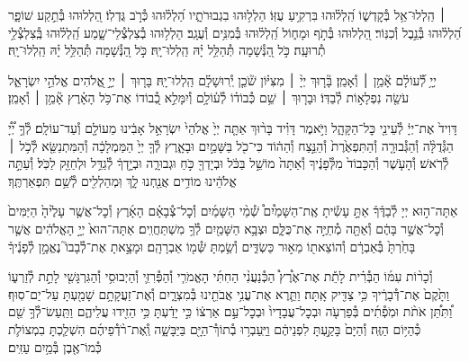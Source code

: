 \documentclass[twoside, openany, parskip=half, 11pt]{book}
\begin{document}
 ׀ \hfill \break
הַֽלְלוּ־אֵ֥ל בְּ֯קׇדְשׁ֑וֹ הַֽ֝לְל֗וּהוּ בִּרְקִ֥יעַ עֻזּֽוֹ׃
הַלְל֥וּהוּ בִגְבוּרֹתָ֑יו הַ֝לְל֗וּהוּ כְּ֯רֹ֣ב גֻּדְלֽוֹ׃
הַ֭לְלוּהוּ בְּ֯תֵ֣קַע שׁוֹפָ֑ר הַ֝לְל֗וּהוּ בְּ֯נֵ֣בֶל וְ֯כִנּֽוֹר׃
הַ֭לְלוּהוּ בְּ֯תֹ֣ף וּמָח֑וֹל הַֽ֝לְל֗וּהוּ בְּ֯מִנִּ֥ים וְ֯עֻגָֽב׃
הַלְל֥וּהוּ בְ֯צִלְצְ֯לֵי־שָׁ֑מַע הַֽ֝לְל֗וּהוּ בְּֽ֯צִלְצְ֯לֵ֥י תְ֯רוּעָֽה׃
כֹּ֣ל הַ֭נְּ֯שָׁמָה תְּ֯הַלֵּ֥ל יָ֗הּ הַֽלְלוּ־יָֽהּ׃
\scriptsize{כֹּ֣ל הַ֭נְּ֯שָׁמָה תְּ֯הַלֵּ֥ל יָ֗הּ הַֽלְלוּ־יָֽהּ׃ \\}
\normalsize{}

\negline

יְיָ֥ לְ֯֝עוֹלָ֗ם אָ֘מֵ֥ן ׀ וְ֯אָמֵֽן׃ \hfill \break
{}בָּ֘ר֤וּךְ יְיָ֨ ׀ מִצִּיּ֗וֹן שֹׁ֘כֵ֤ן יְֽ֯רוּשָׁלָ֗‍ִם הַֽלְלוּ־יָֽהּ׃ \hfill \break
{}בָּר֤וּךְ ׀ יְיָ֣ אֱ֭לֹהִים אֱלֹהֵ֣י יִשְׂרָאֵ֑ל עֹשֵׂ֖ה נִפְלָא֣וֹת לְ֯בַדּֽוֹ׃ \hfill \break
וּבָר֤וּךְ ׀ שֵׁ֥ם כְּ֯בוֹד֗וֹ לְ֯ע֫וֹלָ֥ם וְ֯יִמָּלֵ֣א כְ֭֯בוֹדוֹ אֶת־כֹּ֥ל הָאָ֗רֶץ אָ֘מֵ֥ן ׀ וְ֯אָמֵֽן׃





דָּוִיד֙ אֶת־יְיָ֔ לְ֯עֵינֵ֖י כׇּל־הַקָּהָ֑ל וַיֹּ֣אמֶר דָּוִ֗יד בָּר֨וּךְ אַתָּ֤ה יְיָ֙ אֱלֹהֵי֙ יִשְׂרָאֵ֣ל אָבִ֔ינוּ מֵעוֹלָ֖ם וְ֯עַד־עוֹלָֽם׃
לְ֯ךָ֣ יְ֠יָ֠ הַגְּ֯דֻלָּ֨ה וְ֯הַגְּ֯בוּרָ֤ה וְ֯הַתִּפְאֶ֙רֶת֙ וְ֯הַנֵּ֣צַח וְ֯הַה֔וֹד כִּי־כֹ֖ל בַּשָּׁמַ֣יִם וּבָאָ֑רֶץ לְ֯ךָ֤ יְיָ֙ הַמַּמְלָכָ֔ה וְ֯הַמִּתְנַשֵּׂ֖א לְ֯כֹ֥ל ׀ לְ֯רֹֽאשׁ׃
וְ֯הָעֹ֤שֶׁר וְ֯הַכָּבוֹד֙ מִלְּ֯פָנֶ֔יךָ וְ֯אַתָּה֙ מוֹשֵׁ֣ל בַּכֹּ֔ל וּבְיָדְךָ֖ כֹּ֣חַ וּגְבוּרָ֑ה וּבְיָ֣דְךָ֔ לְ֯גַדֵּ֥ל וּלְחַזֵּ֖ק לַכֹּֽל׃
וְ֯עַתָּ֣ה אֱלֹהֵ֔ינוּ מוֹדִ֥ים אֲנַ֖חְנוּ לָ֑ךְ וּֽמְהַלְלִ֖ים לְ֯שֵׁ֥ם תִּפְאַרְתֶּֽךָ׃





אַתָּה־ה֣וּא
יְיָ לְ֯בַדֶּ֒ךָ֒ אַתָּ֣ עָשִׂ֡יתָ אֶֽת־הַשָּׁמַ֩יִם֩ שְׁ֯מֵ֨י הַשָּׁמַ֜יִם וְ֯כׇל־צְ֯בָאָ֗ם הָאָ֜רֶץ וְ֯כׇל־אֲשֶׁ֤ר עָלֶ֙יהָ֙ הַיַּמִּים֙ וְ֯כׇל־אֲשֶׁ֣ר בָּהֶ֔ם וְ֯אַתָּ֖ה מְ֯חַיֶּ֣ה אֶת־כֻּלָּ֑ם וּצְבָ֥א הַשָּׁמַ֖יִם לְ֯ךָ֥ מִשְׁתַּחֲוִֽים׃
אַתָּה־הוּא֙ יְיָ֣ הָאֱלֹהִ֔ים אֲשֶׁ֤ר בָּחַ֙רְתָּ֙ בְּ֯אַבְרָ֔ם וְ֯הוֹצֵאת֖וֹ מֵא֣וּר כַּשְׂדִּ֑ים וְ֯שַׂ֥מְתָּ שְּׁ֯מ֖וֹ אַבְרָהָֽם׃ וּמָצָ֣אתָ אֶת־לְ֯בָבוֹ֮ נֶאֱמָ֣ן לְ֯פָנֶ֒יךָ֒

וְ֯כָר֨וֹת עִמּ֜וֹ הַבְּ֯רִ֗ית לָתֵ֡ת אֶת־אֶ֩רֶץ֩ הַכְּ֯נַעֲנִ֨י הַחִתִּ֜י הָאֱמֹרִ֧י וְ֯הַפְּ֯רִזִּ֛י וְ֯הַיְבוּסִ֥י וְ֯הַגִּרְגָּשִׁ֖י לָתֵ֣ת לְ֯זַרְע֑וֹ וַתָּ֙קֶם֙ אֶת־דְּ֯בָרֶ֔יךָ כִּ֥י צַדִּ֖יק אָֽתָּה׃ וַתֵּ֛רֶא אֶת־עֳנִ֥י אֲבֹתֵ֖ינוּ בְּ֯מִצְרָ֑יִם וְ֯אֶת־זַעֲקָתָ֥ם שָׁמַ֖עְתָּ עַל־יַם־סֽוּף׃ וַ֠תִּתֵּ֠ן אֹתֹ֨ת וּמֹֽפְ֯תִ֜ים בְּ֯פַרְעֹ֤ה וּבְכׇל־עֲבָדָיו֙ וּבְכׇל־עַ֣ם אַרְצ֔וֹ כִּ֣י יָדַ֔עְתָּ כִּ֥י הֵזִ֖ידוּ עֲלֵיהֶ֑ם וַתַּֽעַשׂ־לְ֯ךָ֥ שֵׁ֖ם כְּ֯הַיּ֥וֹם הַזֶּֽה׃
וְ֯הַיָּם֙ בָּקַ֣עְתָּ לִפְנֵיהֶ֔ם וַיַּֽעַבְר֥וּ בְ֯תוֹךְ֯־הַיָּ֖ם בַּיַּבָּשָׁ֑ה וְֽ֯אֶת־רֹ֨דְ֯פֵיהֶ֜ם הִשְׁלַ֧כְתָּ בִמְצוֹלֹ֛ת כְּ֯מוֹ־אֶ֖בֶן בְּ֯מַ֥יִם עַזִּֽים׃
\end{document}

